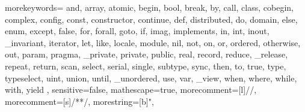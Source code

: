   {
    morekeywords={
      and, array, atomic,
      begin, bool, break, by,
      call, class, cobegin, complex, config, const, constructor, continue,
      def, distributed, do, domain,
      else, enum, except,
      false, for, forall,
      goto,
      if, imag, implements, in, int, inout, _invariant, iterator,
      let, like, locale,
      module,
      nil, not,
      on, or, ordered, otherwise, out,
      param, pragma, _private, private, public,
      real, record, reduce, _release, repeat, return,
      scan, select, serial, single, subtype, sync,
      then, to, true, type, typeselect,
      uint, union, until, _unordered, use,
      var, _view,
      when, where, while, with,
      yield
    },
    sensitive=false,
    mathescape=true,
    morecomment=[l]{//},
    morecomment=[s]{/*}{*/},
    morestring=[b]",
}

\lstset{
    basicstyle=\footnotesize\ttfamily,
    keywordstyle=\bfseries,
    commentstyle=\em,
    showstringspaces=false,
    flexiblecolumns=false,
    numbers=left,
    numbersep=5pt,
    numberstyle=\tiny,
    numberblanklines=false,
    stepnumber=0
  }

\newcommand{\chpl}[1]{\lstinline[language=chapel,basicstyle=\normalsize\ttfamily,keywordstyle=]!#1!}

